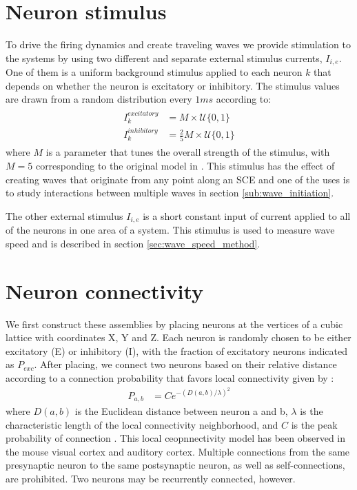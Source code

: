 \section{Neuron stimulus}
To drive the firing dynamics and create traveling waves we provide stimulation to the systems by using two different and separate external stimulus currents, $I_{i,e}$. 
One of them is a uniform background stimulus applied to each neuron $k$ that depends on whether the neuron is excitatory or inhibitory.
The stimulus values are drawn from a random distribution every $1 ms$ according to:
\begin{align}\label{eq:randomstim}
 \begin{split}
  I_k^{excitatory} &= M \times \mathcal{U}\{0,1 \} \\
  I_k^{inhibitory} &= \frac{2}{5} M \times \mathcal{U}\{0,1 \}
 \end{split}
\end{align}
where $M$ is a parameter that tunes the overall strength of the stimulus, with $M=5$ corresponding to the original model in \citep{izhikevich2003}. 
This stimulus has the effect of creating waves that originate from any point along an SCE and one of the uses is to study interactions between multiple waves in section \ref{sub:wave_initiation}.

The other external stimulus $I_{i,e}$ is a short constant input of current applied to all of the neurons in one area of a system.
This stimulus is used to measure wave speed and is described in section \ref{sec:wave_speed_method}.

\section{Neuron connectivity}
We first construct these assemblies by placing neurons at the vertices of a cubic lattice with coordinates X, Y and Z. 
Each neuron is  randomly chosen to be  either excitatory (E) or inhibitory (I), with the fraction of excitatory neurons indicated as $P_{exc}$.
After placing, we connect two neurons based on their relative distance according to a connection probability that favors local connectivity given by \citep{maass2002}: 
\begin{align}\label{eq:connectivity}
 P_{a,b} &= C e^{-(D(a,b)/\lambda)^2}
\end{align}
where $D(a,b)$ is the Euclidean distance between neuron a and b, $\lambda$ is the characteristic length of the local connectivity neighborhood, and $C$ is the peak probability of connection .
This local ceopnnectivity model has been observed in the mouse visual cortex\citep{Hellwig2000} and auditory cortex\citep{Levy2012}.
Multiple connections from the same presynaptic neuron to the same postsynaptic neuron, as well as self-connections, are prohibited.
Two neurons may be recurrently connected, however. 

